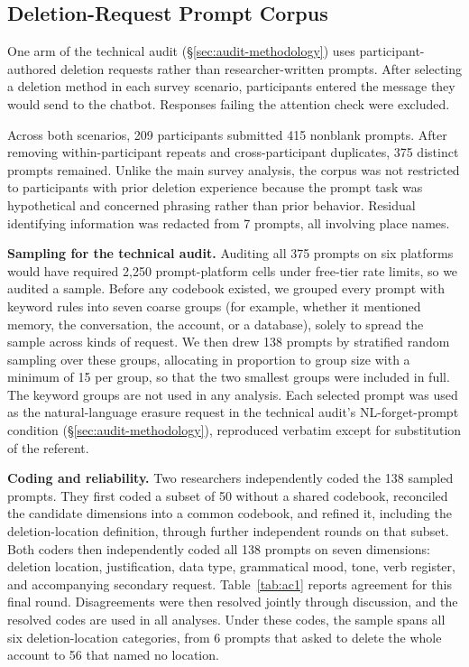 \documentclass[conference,compsoc]{IEEEtran}
\begin{document}
\subsection{Deletion-Request Prompt Corpus}
\label{sec:prompt-corpus}

One arm of the technical audit (\S\ref{sec:audit-methodology}) uses participant-authored deletion requests rather than researcher-written prompts. After selecting a deletion method in each survey scenario, participants entered the message they would send to the chatbot. Responses failing the attention check were excluded.

Across both scenarios, 209 participants submitted 415 nonblank prompts. After removing within-participant repeats and cross-participant duplicates, 375 distinct prompts remained. Unlike the main survey analysis, the corpus was not restricted to participants with prior deletion experience because the prompt task was hypothetical and concerned phrasing rather than prior behavior. Residual identifying information was redacted from 7 prompts, all involving place names.

\textbf{Sampling for the technical audit.} Auditing all 375 prompts on six platforms would have required 2,250 prompt-platform cells under free-tier rate limits, so we audited a sample. Before any codebook existed, we grouped every prompt with keyword rules into seven coarse groups (for example, whether it mentioned memory, the conversation, the account, or a database), solely to spread the sample across kinds of request. We then drew 138 prompts by stratified random sampling over these groups, allocating in proportion to group size with a minimum of 15 per group, so that the two smallest groups were included in full. The keyword groups are not used in any analysis. Each selected prompt was used as the natural-language erasure request in the technical audit's NL-forget-prompt condition (\S\ref{sec:audit-methodology}), reproduced verbatim except for substitution of the referent.

\textbf{Coding and reliability.} Two researchers independently coded the 138 sampled prompts. They first coded a subset of 50 without a shared codebook, reconciled the candidate dimensions into a common codebook, and refined it, including the deletion-location definition, through further independent rounds on that subset. Both coders then independently coded all 138 prompts on seven dimensions: deletion location, justification, data type, grammatical mood, tone, verb register, and accompanying secondary request. Table~\ref{tab:ac1} reports agreement for this final round. Disagreements were then resolved jointly through discussion, and the resolved codes are used in all analyses. Under these codes, the sample spans all six deletion-location categories, from 6 prompts that asked to delete the whole account to 56 that named no location.
\end{document}
